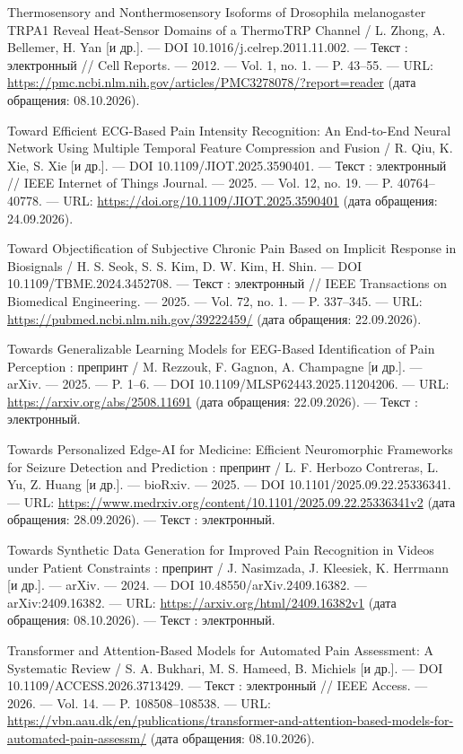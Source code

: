 \begin{list}{}{\setlength{\leftmargin}{10mm}\setlength{\labelwidth}{8mm}\setlength{\labelsep}{2mm}\setlength{\itemsep}{0pt}\setlength{\parsep}{0pt}\setlength{\topsep}{0pt}}
\item[282.] Thermosensory and Nonthermosensory Isoforms of Drosophila melanogaster TRPA1 Reveal Heat-Sensor Domains of a ThermoTRP Channel / L. Zhong, A. Bellemer, H. Yan [и др.]. — DOI 10.1016/j.celrep.2011.11.002. — Текст : электронный // Cell Reports. — 2012. — Vol. 1, no. 1. — P. 43–55. — URL: \url{https://pmc.ncbi.nlm.nih.gov/articles/PMC3278078/?report=reader} (дата обращения: 08.10.2026).
\item[283.] Toward Efficient ECG-Based Pain Intensity Recognition: An End-to-End Neural Network Using Multiple Temporal Feature Compression and Fusion / R. Qiu, K. Xie, S. Xie [и др.]. — DOI 10.1109/JIOT.2025.3590401. — Текст : электронный // IEEE Internet of Things Journal. — 2025. — Vol. 12, no. 19. — P. 40764–40778. — URL: \url{https://doi.org/10.1109/JIOT.2025.3590401} (дата обращения: 24.09.2026).
\item[284.] Toward Objectification of Subjective Chronic Pain Based on Implicit Response in Biosignals / H. S. Seok, S. S. Kim, D. W. Kim, H. Shin. — DOI 10.1109/TBME.2024.3452708. — Текст : электронный // IEEE Transactions on Biomedical Engineering. — 2025. — Vol. 72, no. 1. — P. 337–345. — URL: \url{https://pubmed.ncbi.nlm.nih.gov/39222459/} (дата обращения: 22.09.2026).
\item[285.] Towards Generalizable Learning Models for EEG-Based Identification of Pain Perception : препринт / M. Rezzouk, F. Gagnon, A. Champagne [и др.]. — arXiv. — 2025. — P. 1–6. — DOI 10.1109/MLSP62443.2025.11204206. — URL: \url{https://arxiv.org/abs/2508.11691} (дата обращения: 22.09.2026). — Текст : электронный.
\item[286.] Towards Personalized Edge-AI for Medicine: Efficient Neuromorphic Frameworks for Seizure Detection and Prediction : препринт / L. F. Herbozo Contreras, L. Yu, Z. Huang [и др.]. — bioRxiv. — 2025. — DOI 10.1101/2025.09.22.25336341. — URL: \url{https://www.medrxiv.org/content/10.1101/2025.09.22.25336341v2} (дата обращения: 28.09.2026). — Текст : электронный.
\item[287.] Towards Synthetic Data Generation for Improved Pain Recognition in Videos under Patient Constraints : препринт / J. Nasimzada, J. Kleesiek, K. Herrmann [и др.]. — arXiv. — 2024. — DOI 10.48550/arXiv.2409.16382. — arXiv:2409.16382. — URL: \url{https://arxiv.org/html/2409.16382v1} (дата обращения: 08.10.2026). — Текст : электронный.
\item[288.] Transformer and Attention-Based Models for Automated Pain Assessment: A Systematic Review / S. A. Bukhari, M. S. Hameed, B. Michiels [и др.]. — DOI 10.1109/ACCESS.2026.3713429. — Текст : электронный // IEEE Access. — 2026. — Vol. 14. — P. 108508–108538. — URL: \url{https://vbn.aau.dk/en/publications/transformer-and-attention-based-models-for-automated-pain-assessm/} (дата обращения: 08.10.2026).

\end{list}
